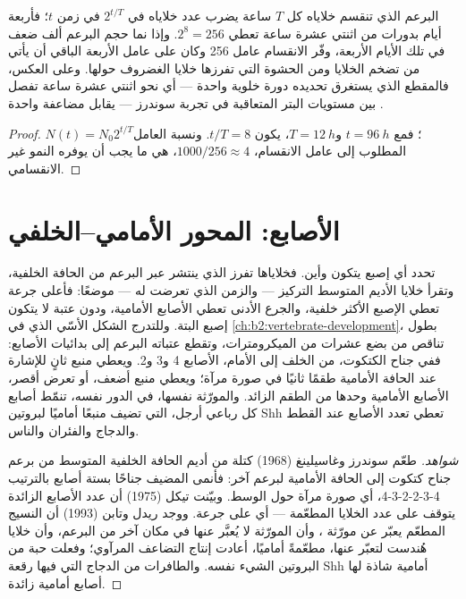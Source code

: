 \begin{theorem}\label{thm:b2:limb-organogenesis:growth}
البرعم الذي تنقسم خلاياه كل $T$ ساعة يضرب عدد خلاياه
في $2^{t/T}$ في زمن $t$؛ فأربعة أيام بدورات من اثنتي عشرة ساعة تعطي
$2^{8} = 256$. وإذا نما حجم البرعم ألف ضعف في تلك
الأيام الأربعة، وفّر الانقسام عامل 256 وكان على عامل
الأربعة الباقي أن يأتي من تضخم الخلايا ومن الحشوة
التي تفرزها خلايا الغضروف حولها. وعلى العكس، فالمقطع
الذي يستغرق تحديده دورة خلوية واحدة --- أي نحو اثنتي عشرة
ساعة تفصل بين مستويات البتر المتعاقبة في تجربة
سوندرز --- يقابل مضاعفة واحدة .
\end{theorem}
\begin{proof}
$N(t) = N_0 2^{t/T}$؛ فمع $t = \qty{96}{h}$ و$T = \qty{12}{h}$،
يكون $t/T = 8$. ونسبة العامل المطلوب إلى عامل الانقسام،
$1000/256 \approx 4$، هي ما يجب أن يوفره النمو غير الانقسامي.
\end{proof}

\section{الأصابع: المحور الأمامي--الخلفي}

\begin{proposition}\label{prop:b2:limb-organogenesis:zpa}
تحدد  أي إصبع يتكون وأين. فخلاياها تفرز
 الذي ينتشر عبر البرعم من الحافة الخلفية،
وتقرأ خلايا الأديم المتوسط التركيز --- والزمن الذي
تعرضت له --- موضعًا: فأعلى جرعة تعطي الإصبع
الأكثر خلفية، والجرع الأدنى تعطي الأصابع الأمامية، ودون
عتبة لا يتكون إصبع البتة. وللتدرج الشكل الأسّي الذي في
\cref{ch:b2:vertebrate-development}، بطول تناقص من بضع
عشرات من الميكرومترات، وتقطع عتباته البرعم إلى
بدائيات الأصابع: ففي جناح الكتكوت، من الخلف إلى
الأمام، الأصابع 4 و3 و2. ويعطي منبع ثانٍ للإشارة عند
الحافة الأمامية طقمًا ثانيًا في صورة مرآة؛ ويعطي منبع أضعف،
أو تعرض أقصر، الأصابع الأمامية وحدها من الطقم الزائد.
والمورّثة نفسها، في الدور نفسه، تنمّط أصابع كل رباعي أرجل،
 التي تضيف منبعًا أماميًا لبروتين Shh تعطي تعدد الأصابع عند القطط
والدجاج والفئران والناس.
\end{proposition}
\begin{proof}[شواهد]
طعّم سوندرز وغاسيلينغ (1968) كتلة من أديم الحافة الخلفية المتوسط
من برعم جناح كتكوت إلى الحافة الأمامية لبرعم آخر:
فأنمى المضيف جناحًا بستة أصابع بالترتيب 4-3-2-2-3-4،
أي صورة مرآة حول الوسط. وبيّنت تيكل (1975) أن عدد
الأصابع الزائدة يتوقف على عدد الخلايا المطعّمة --- أي على جرعة.
ووجد ريدل وتابن (1993) أن النسيج المطعّم يعبّر عن
مورّثة \emph{}، وأن المورّثة لا يُعبَّر عنها في مكان آخر
من البرعم، وأن خلايا هُندست لتعبّر عنها، مطعّمةً
أماميًا، أعادت إنتاج التضاعف المرآوي؛ وفعلت حبة من البروتين
الشيء نفسه. والطافرات من الدجاج التي فيها رقعة Shh أمامية شاذة
لها أصابع أمامية زائدة.
\end{proof}

